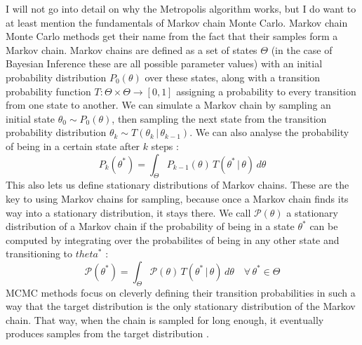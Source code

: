 \documentclass[12pt, a4paper]{report}
\begin{document}
I will not go into detail on why the Metropolis algorithm works, but I do want to at least mention the fundamentals of Markov chain Monte Carlo.
Markov chain Monte Carlo methods get their name from the fact that their samples form a Markov chain.
Markov chains are defined as a set of states $\Theta$ (in the case of Bayesian Inference these are all possible parameter values) with an initial probability distribution $P_0(\theta)$ over these states, along with a transition probability function $T: \Theta \times \Theta \rightarrow [0,1]$ assigning a probability to every transition from one state to another.
We can simulate a Markov chain by sampling an initial state $\theta_0 \sim P_0(\theta)$, then sampling the next state from the transition probability distribution $\theta_k \sim T(\theta_k \,|\, \theta_{k-1})$.
We can also analyse the probability of being in a certain state after $k$ steps \cite[372]{mckay}: 
$$
    P_k(\theta^*) = \int_{\Theta} P_{k-1}(\theta) \, T(\theta^* \,|\, \theta) \, d\theta 
$$
This also lets us define stationary distributions of Markov chains.
These are the key to using Markov chains for sampling, because once a Markov chain finds its way into a stationary distribution, it stays there.
We call $\mathcal{P}(\theta)$ a stationary distribution of a Markov chain if the probability of being in a state $\theta^*$ can be computed by integrating over the probabilites of being in any other state and transitioning to $theta^*$ \cite[372]{mckay}:
$$
    \mathcal{P}(\theta^*) = \int_{\Theta} \mathcal{P}(\theta) \, T(\theta^* \,|\, \theta) \, d\theta \quad \forall \, \theta^* \in \Theta
$$
MCMC methods focus on cleverly defining their transition probabilities in such a way that the target distribution is the only stationary distribution of the Markov chain.
That way, when the chain is sampled for long enough, it eventually produces samples from the target distribution \cite[372]{mckay}.
\end{document}
